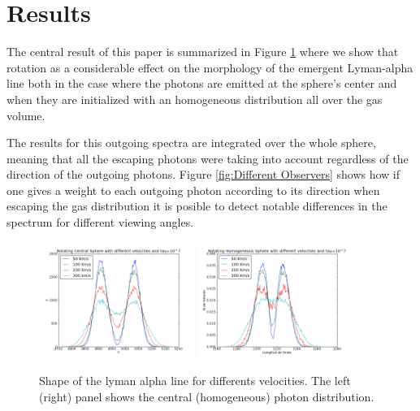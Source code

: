 \documentclass[usenatbib]{mn2e}
\begin{document}
\section{Results}
\label{sec:results}

The central result of this paper is summarized in Figure
\ref{fig:HOMandCentral} where we show that rotation as a considerable
effect on the morphology of the emergent Lyman-alpha line both in the
case where the photons are emitted at the sphere's center and when
they are initialized with an homogeneous distribution all over the
gas volume. 

The results for this outgoing spectra are integrated over the whole
sphere, meaning that all the escaping photons were taking into account
regardless of the direction of the outgoing photons. Figure
\ref{fig:Different Observers} shows how if one gives a weight to each outgoing
photon according to its direction when escaping the gas distribution
it is posible to detect notable differences in the spectrum for
different viewing angles.



\begin{figure}
  \includegraphics[width=0.45\textwidth]{7tDifSpeedsZ.png}
  \includegraphics[width=0.45\textwidth]{7tHOMDifSpeeds1.png}
  \label{fig:HOMandCentral}\caption{Shape of the lyman alpha line for
    differents velocities. The left (right) panel shows the central
    (homogeneous) photon distribution.}
\end{figure}
\end{document}
